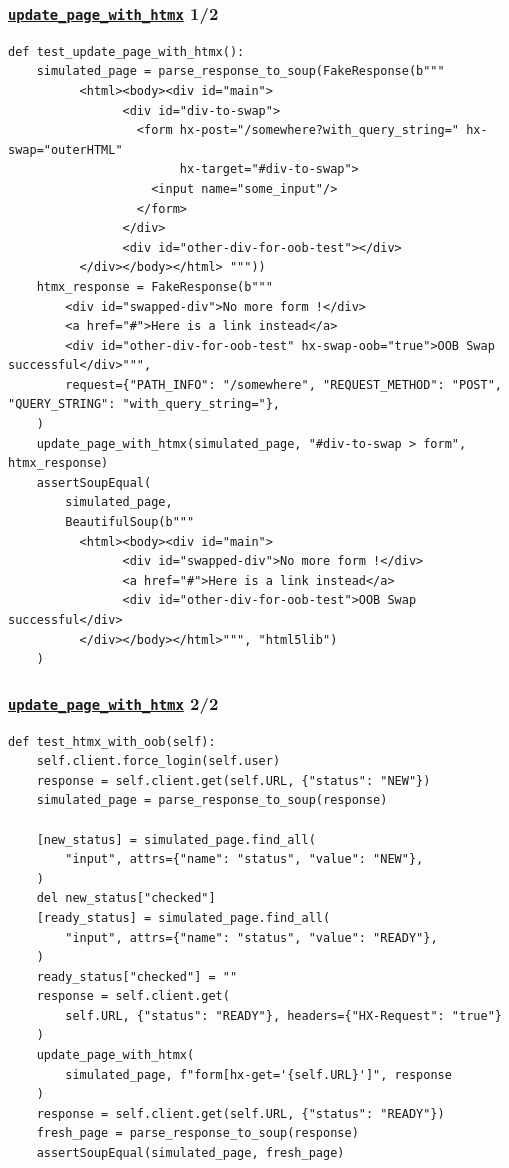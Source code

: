 \documentclass{beamer}
\begin{document}
\begin{frame}[fragile]
    \frametitle{\href{https://github.com/gip-inclusion/les-emplois/blob/c05aac7f05d44c0a702076f9694bdf97ab7bfe8c/tests/utils/htmx/tests.py\#L27}{\texttt{update\_page\_with\_htmx}} \hfill{} 1/2}

    \begin{verbatim}
def test_update_page_with_htmx():
    simulated_page = parse_response_to_soup(FakeResponse(b"""
          <html><body><div id="main">
                <div id="div-to-swap">
                  <form hx-post="/somewhere?with_query_string=" hx-swap="outerHTML"
                        hx-target="#div-to-swap">
                    <input name="some_input"/>
                  </form>
                </div>
                <div id="other-div-for-oob-test"></div>
          </div></body></html> """))
    htmx_response = FakeResponse(b"""
        <div id="swapped-div">No more form !</div>
        <a href="#">Here is a link instead</a>
        <div id="other-div-for-oob-test" hx-swap-oob="true">OOB Swap successful</div>""",
        request={"PATH_INFO": "/somewhere", "REQUEST_METHOD": "POST", "QUERY_STRING": "with_query_string="},
    )
    update_page_with_htmx(simulated_page, "#div-to-swap > form", htmx_response)
    assertSoupEqual(
        simulated_page,
        BeautifulSoup(b"""
          <html><body><div id="main">
                <div id="swapped-div">No more form !</div>
                <a href="#">Here is a link instead</a>
                <div id="other-div-for-oob-test">OOB Swap successful</div>
          </div></body></html>""", "html5lib")
    )
    \end{verbatim}
\end{frame}

\begin{frame}[fragile]
    \frametitle{\href{https://github.com/gip-inclusion/les-emplois/blob/9d800e6b3c8a814f17303157966830a0411db8e5/tests/utils/htmx/test.py\#L64}{\texttt{update\_page\_with\_htmx}} \hfill{} 2/2}
    \vspace{-0.3cm}
    \begin{verbatim}
def test_htmx_with_oob(self):
    self.client.force_login(self.user)
    response = self.client.get(self.URL, {"status": "NEW"})
    simulated_page = parse_response_to_soup(response)

    [new_status] = simulated_page.find_all(
        "input", attrs={"name": "status", "value": "NEW"},
    )
    del new_status["checked"]
    [ready_status] = simulated_page.find_all(
        "input", attrs={"name": "status", "value": "READY"},
    )
    ready_status["checked"] = ""
    response = self.client.get(
        self.URL, {"status": "READY"}, headers={"HX-Request": "true"}
    )
    update_page_with_htmx(
        simulated_page, f"form[hx-get='{self.URL}']", response
    )
    response = self.client.get(self.URL, {"status": "READY"})
    fresh_page = parse_response_to_soup(response)
    assertSoupEqual(simulated_page, fresh_page)
    \end{verbatim}
\end{frame}
\end{document}
